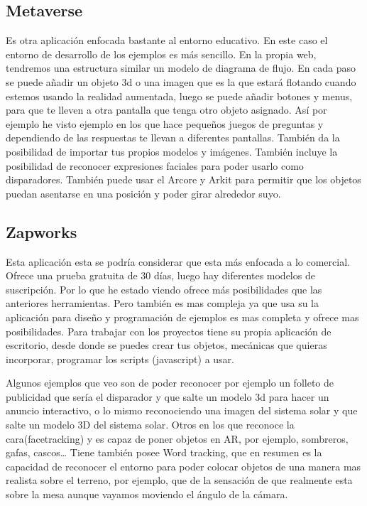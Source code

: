 \subsection{Metaverse}
Es otra aplicación enfocada bastante al entorno educativo. En este caso el entorno de desarrollo de los ejemplos es más sencillo. En la propia web, tendremos una estructura similar un modelo de diagrama de flujo. En cada paso se puede añadir un objeto 3d o una imagen que es la que estará flotando cuando estemos usando la realidad aumentada, luego se puede añadir botones y menus, para que te lleven a otra pantalla que tenga otro objeto asignado. Así por ejemplo he visto ejemplo en los que hace pequeños juegos de preguntas y dependiendo de las respuestas te llevan a diferentes pantallas.
También da la posibilidad de importar tus propios modelos y imágenes.
También incluye la posibilidad de reconocer expresiones faciales para poder usarlo como disparadores.
También puede usar el Arcore y Arkit para permitir que los objetos puedan asentarse en una posición y poder girar alrededor suyo.

\subsection{Zapworks}
Esta aplicación esta se podría considerar que esta más enfocada a lo comercial. Ofrece una prueba gratuita de 30 días, luego hay diferentes modelos de suscripción.
Por lo que he estado viendo ofrece más posibilidades que las anteriores herramientas. Pero también es mas compleja ya que usa su la aplicación para diseño y programación de ejemplos es mas completa y ofrece mas posibilidades.
Para trabajar con los proyectos tiene su propia aplicación de escritorio, desde donde se puedes crear tus objetos, mecánicas que quieras incorporar, programar los scripts (javascript) a usar.

Algunos ejemplos que veo son de poder reconocer por ejemplo un folleto de publicidad que sería el disparador y que salte un modelo 3d para hacer un anuncio interactivo, o lo mismo reconociendo una imagen del sistema solar y que salte un modelo 3D del sistema solar. 
Otros en los que reconoce la cara(facetracking) y es capaz de poner objetos en AR, por ejemplo, sombreros, gafas, cascos…
Tiene también posee Word tracking, que en resumen es la capacidad de reconocer el entorno para poder colocar objetos de una manera mas realista sobre el terreno, por ejemplo, que de la sensación de que realmente esta sobre la mesa aunque vayamos moviendo el ángulo de la cámara.


